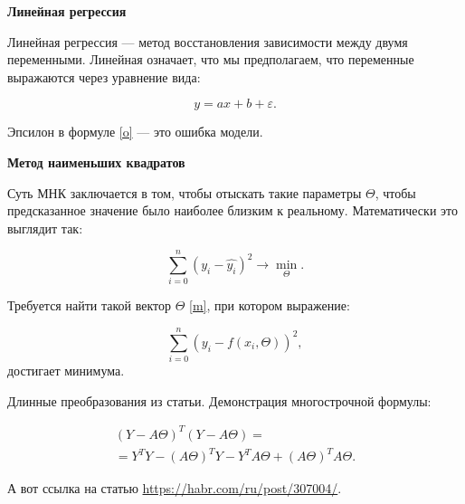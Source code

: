 \documentclass[a4paper,14pt]{extreport}
\begin{document}
	
	\begin{center}
		\Large
		\textbf{Линейная регрессия}
	\end{center}

	Линейная регрессия — метод восстановления зависимости между двумя переменными. Линейная означает, что мы предполагаем, что переменные выражаются через уравнение вида:
	
	\begin{equation}
		y = ax + b + \varepsilon.
		\label{o} 
	\end{equation}

	Эпсилон в формуле \eqref{o} — это ошибка модели. 
	
	\begin{center}
		\Large
		\textbf{Метод наименьших квадратов}
	\end{center}

	Суть МНК заключается в том, чтобы отыскать такие параметры $\Theta$, чтобы предсказанное значение было наиболее близким к реальному. Математически это выглядит так:
	
	\begin{equation}
		\sum\limits_{i=0}^n(y_i - \hat{y_i})^2 \longrightarrow \min\limits_{\Theta}.
		\label{m} 
	\end{equation}

	  Требуется найти такой вектор $\Theta$ \eqref{m}, при котором выражение:
	  
	  \begin{equation}
	  	\sum\limits_{i=0}^n(y_i - f(x_i, \Theta))^2,
	  \end{equation}
	  достигает минимума.
	  
	  Длинные преобразования из статьи. Демонстрация многострочной формулы:
	
	  \begin{multline}
	  	(Y-A\Theta)^T(Y-A\Theta) =\\
	  	= Y^TY-(A\Theta)^TY-Y^TA\Theta+(A\Theta)^TA\Theta.
	  \end{multline}
	  
	  А вот ссылка на статью \href{https://habr.com/ru/post/307004/}{https://habr.com/ru/post/307004/}.
	  
\end{document}
